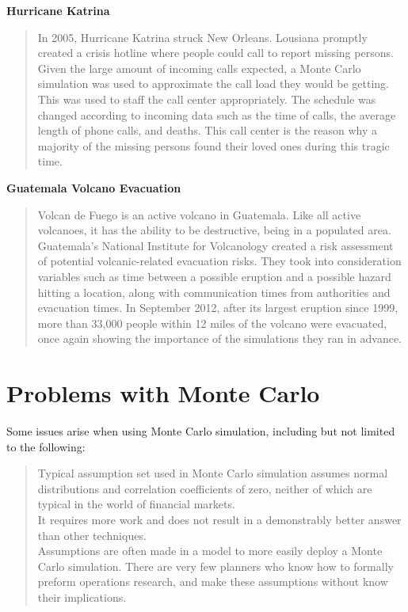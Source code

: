 \documentclass{article}
\begin{document}
\textbf{Hurricane Katrina}

\begin{quote}
In 2005, Hurricane Katrina struck New Orleans. Lousiana promptly created a crisis hotline where people could call to report missing persons. Given the large amount of incoming calls expected, a Monte Carlo simulation was used to approximate the call load they would be getting. This was used to staff the call center appropriately. The schedule was changed according to incoming data such as the time of calls, the average length of phone calls, and deaths. This call center is the reason why a majority of the missing persons found their loved ones during this tragic time.
\end{quote}

\textbf{Guatemala Volcano Evacuation}

\begin{quote}
Volcan de Fuego is an active volcano in Guatemala. Like all active volcanoes, it has the ability to be destructive, being in a populated area. Guatemala’s National Institute for Volcanology created a risk assessment of potential volcanic-related evacuation risks. They took into consideration variables such as time between a possible eruption and a possible hazard hitting a location, along with communication times from authorities and evacuation times. In September 2012, after its largest eruption since 1999, more than 33,000 people within 12 miles of the volcano were evacuated, once again showing the importance of the simulations they ran in advance.
\end{quote}

\pagebreak

\section{Problems with Monte Carlo}

Some issues arise when using Monte Carlo simulation, including but not limited to the following:

\begin{quote}
Typical assumption set used in Monte Carlo simulation assumes normal distributions and correlation coefficients of zero, neither of which are typical in the world of financial markets. \\

It requires more work and does not result in a demonstrably better answer than other techniques. \\

Assumptions are often made in a model to more easily deploy a Monte Carlo simulation. There are very few planners who know how to formally preform operations research, and make these assumptions without know their implications.
\end{quote}
\end{document}
